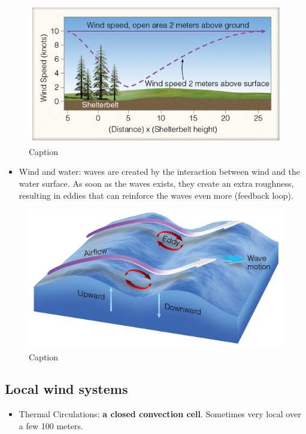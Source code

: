 \documentclass[12pt,oneside]{book}
\providecommand{\tightlist}{%
  \setlength{\itemsep}{0pt}\setlength{\parskip}{0pt}}
\begin{document}
\begin{figure}

{\centering \includegraphics[width=0.8\linewidth]{figures/Figure422} 

}

\caption{Caption}\label{fig:Vegetation}
\end{figure}

\begin{itemize}
\tightlist
\item
  Wind and water: waves are created by the interaction between wind and
  the water surface. As soon as the waves exists, they create an extra
  roughness, resulting in eddies that can reinforce the waves even more
  (feedback loop).
\end{itemize}

\begin{figure}

{\centering \includegraphics[width=0.6\linewidth]{figures/Figure423} 

}

\caption{Caption}\label{fig:Water}
\end{figure}

\subsection{Local wind systems}\label{local-wind-systems}

\begin{itemize}
\tightlist
\item
  Thermal Circulations: \textbf{a closed convection cell}. Sometimes
  very local over a few 100 meters.
\end{itemize}
\end{document}
